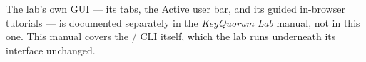 \begin{noteBox}
The lab's own GUI --- its tabs, the Active user bar, and its guided
in-browser tutorials --- is documented separately in the \emph{KeyQuorum
Lab} manual, not in this one. This manual covers the  /
 CLI itself, which the lab runs underneath its
interface unchanged.
\end{noteBox}
